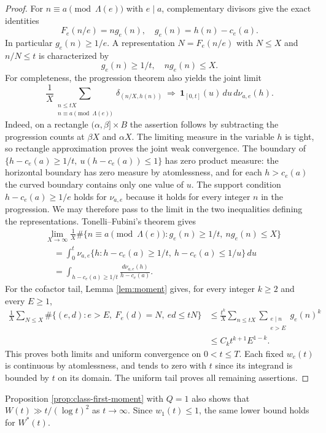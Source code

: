 \documentclass[11pt,letterpaper,reqno]{amsart}
\numberwithin{equation}{section}
\theoremstyle{remark}
\renewcommand{\leq}{\leqslant}
\renewcommand{\geq}{\geqslant}
\begin{document}
\begin{proof}
For $n\equiv a\pmod{\Lambda(e)}$ with $e\mid a$, complementary divisors
give the exact identities
\[
 F_e(n/e)=n g_e(n),
 \quad
 g_e(n)=h(n)-c_e(a).
\]
In particular $g_e(n)\geq1/e$. A representation $N=F_e(n/e)$ with $N\leq X$
and $n/N\leq t$ is characterized by
\[
 g_e(n)\geq1/t,
 \quad n g_e(n)\leq X.
\]
For completeness, the progression theorem also yields the joint limit
\[
 \frac1X\sum_{\substack{n\leq tX\\n\equiv a\pmod{\Lambda(e)}}}
 \delta_{(n/X,h(n))}
 \ \Longrightarrow\
 \boldsymbol1_{[0,t]}(u)\,du\,d\nu_{a,e}(h).
\]
Indeed, on a rectangle $(\alpha,\beta]\times B$ the assertion follows
by subtracting the progression counts at $\beta X$ and $\alpha X$.
The limiting measure in the variable $h$ is tight, so rectangle approximation proves
the joint weak convergence. The boundary of
$\{h-c_e(a)\geq1/t,\ u(h-c_e(a))\leq1\}$ has zero product measure:
the horizontal boundary has zero measure by atomlessness, and for each
$h>c_e(a)$ the curved boundary contains only one value of $u$.
The support condition $h-c_e(a)\geq1/e$ holds for $\nu_{a,e}$ because
it holds for every integer $n$ in the progression. We may therefore pass to
the limit in the two inequalities defining the representations. Tonelli--Fubini's theorem gives
\begin{align*}
 &\lim_{X\to\infty}\frac1X
 \#\{n\equiv a\pmod{\Lambda(e)}:
 g_e(n)\geq1/t,\ n g_e(n)\leq X\}\\
 &\quad=
 \int_0^t\nu_{a,e}
 \{h:h-c_e(a)\geq1/t,\ h-c_e(a)\leq1/u\}\,du\\
 &\quad=
 \int_{h-c_e(a)\geq1/t}
 \frac{d\nu_{a,e}(h)}{h-c_e(a)}.
\end{align*}
For the cofactor tail, Lemma \ref{lem:moment} gives,
for every integer $k\geq2$ and every $E\geq1$,
\begin{align*}
 \frac1X\sum_{N\leq X}
 \#\{(e,d):e>E,\ F_e(d)=N,\ ed\leq tN\}
 &\leq\frac{t^k}{X}
 \sum_{n\leq tX}\sum_{\substack{e\mid n\\e>E}}g_e(n)^k
 \nonumber\\
 &\leq C_kt^{k+1}E^{1-k}.
\end{align*}
This proves both limits and uniform convergence on $0<t\leq T$.
Each fixed $w_e(t)$ is continuous by atomlessness, and tends to
zero with $t$ since its integrand is bounded by $t$ on its domain.
The uniform tail proves all remaining assertions.
\end{proof}

Proposition \ref{prop:class-first-moment} with $Q=1$ also shows that
$W(t)\gg t/(\log t)^2$ as $t\to\infty$. Since $w_1(t)\leq1$,
the same lower bound holds for $W^*(t)$.
\end{document}
